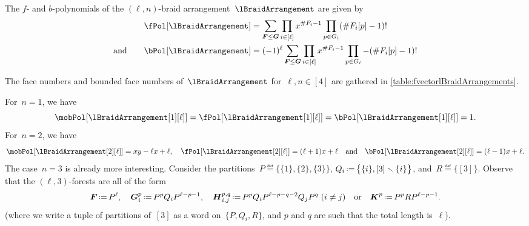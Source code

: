 \begin{corollary}
The $f$- and $b$-polynomials of the $(\ell,n)$-braid arrangement~$\lBraidArrangement$ are given by
\begin{align*}
\fPol[\lBraidArrangement] & = \sum_{\b{F} \le \b{G}} \prod_{i \in [\ell]} x^{\#F_i-1} \prod_{p \in G_i} (\# F_i[p]-1)!\\
\text{and}\qquad
\bPol[\lBraidArrangement] & = (-1)^\ell \sum_{\b{F} \le \b{G}} \prod_{i \in [\ell]} x^{\#F_i-1} \prod_{p \in G_i} -(\# F_i[p]-1)!
\end{align*}
\end{corollary}

The face numbers and bounded face numbers of~$\lBraidArrangement$ for~$\ell, n \in [4]$ are gathered in \cref{table:fvectorlBraidArrangements}.

\begin{example}
For~$n = 1$, we have
\[
\mobPol[{\lBraidArrangement[1][\ell]}] = \fPol[{\lBraidArrangement[1][\ell]}] = \bPol[{\lBraidArrangement[1][\ell]}] = 1.
\]
For~$n = 2$, we have
\[
\mobPol[{\lBraidArrangement[2][\ell]}] = xy-\ell x+\ell,
\quad
\fPol[{\lBraidArrangement[2][\ell]}] = (\ell+1)x+\ell
\quad\text{and}\quad
\bPol[{\lBraidArrangement[2][\ell]}] = (\ell-1)x+\ell.
\]
The case~$n = 3$ is already more interesting.
Consider the partitions~$P \eqdef \big\{ \{1\}, \{2\}, \{3\} \big\}$, $Q_i \eqdef \big\{ \{i\}, [3] \ssm \{i\} \big\}$, and~$R \eqdef \big\{ [3] \big\}$.
Observe that the $(\ell,3)$-forests are all of the form
\begin{gather*}
\b{F} \eqdef P^\ell,
\quad
\b{G}_i^p \eqdef P^p Q_i P^{\ell-p-1}, %
\quad
\b{H}_{i,j}^{p,q} \eqdef P^p Q_i P^{\ell-p-q-2} Q_j P^q \;\text{($i \ne j$)} %
\quad\text{or}\quad
\b{K}^p \eqdef P^p R P^{\ell-p-1}. %
\end{gather*}
(where we write a tuple of partitions of~$[3]$ as a word on~$\{P, Q_i, R\}$, and $p$ and $q$ are such that the total length is~$\ell$).

\end{example}
